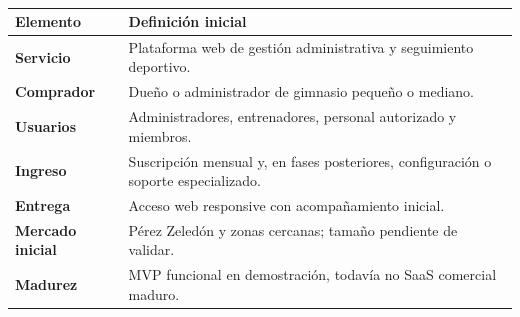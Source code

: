 \begin{table}[H]
\caption{Resumen del modelo de negocio de GymHub}
\begin{tabularx}{\textwidth}{>{\bfseries}p{3.5cm}X}
\toprule
Elemento & Definición inicial \\
\midrule
Servicio & Plataforma web de gestión administrativa y seguimiento deportivo. \\
Comprador & Dueño o administrador de gimnasio pequeño o mediano. \\
Usuarios & Administradores, entrenadores, personal autorizado y miembros. \\
Ingreso & Suscripción mensual y, en fases posteriores, configuración o soporte especializado. \\
Entrega & Acceso web responsive con acompañamiento inicial. \\
Mercado inicial & Pérez Zeledón y zonas cercanas; tamaño pendiente de validar. \\
Madurez & MVP funcional en demostración, todavía no SaaS comercial maduro. \\
\bottomrule
\end{tabularx}
\caption*{\fuentepropia}
\end{table}
